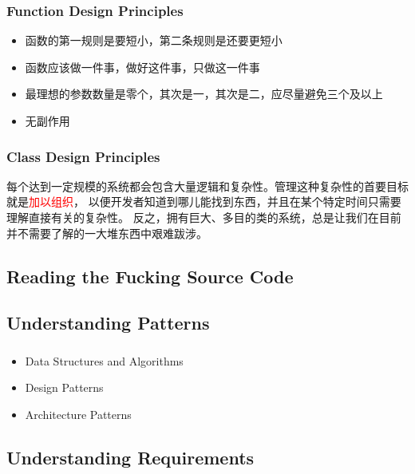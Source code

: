\begin{frame}
  \frametitle{Function Design Principles}
  \begin{itemize}
    \item 函数的第一规则是要短小，第二条规则是还要更短小
    \item 函数应该做一件事，做好这件事，只做这一件事
    \item 最理想的参数数量是零个，其次是一，其次是二，应尽量避免三个及以上
    \item 无副作用
  \end{itemize}
\end{frame}

\begin{frame}
  \frametitle{Class Design Principles}
  每个达到一定规模的系统都会包含大量逻辑和复杂性。管理这种复杂性的首要目标就是\textcolor{red}{加以组织}，
  以便开发者知道到哪儿能找到东西，并且在某个特定时间只需要理解直接有关的复杂性。 
  反之，拥有巨大、多目的类的系统，总是让我们在目前并不需要了解的一大堆东西中艰难跋涉。
\end{frame}

\subsection{Reading the Fucking Source Code}
\begin{frame}
  \frametitle{\subsecname}
\end{frame}

\subsection{Understanding Patterns}
\begin{frame}
  \frametitle{\subsecname}
  \begin{itemize}
    \item Data Structures and Algorithms
    \item Design Patterns
    \item Architecture Patterns
  \end{itemize}
\end{frame}

\subsection{Understanding Requirements}
\begin{frame}
  \frametitle{\subsecname}
\end{frame}

